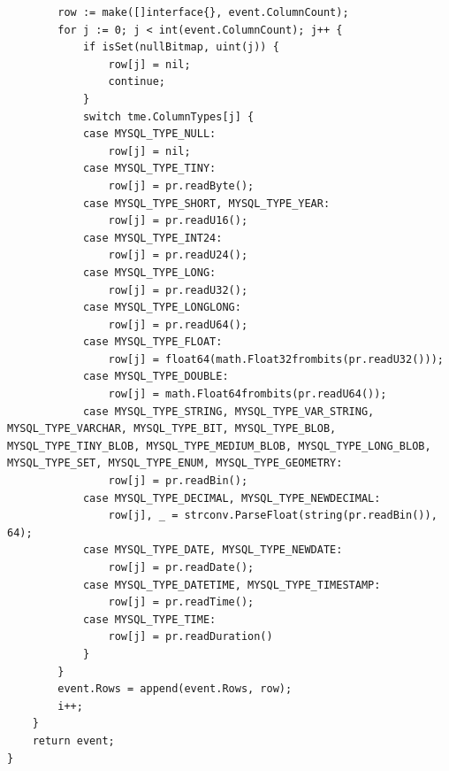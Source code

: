 \documentclass[a4paper, titlepage, 10pt, bookmark]{article}
\begin{document}
\begin{spacing}{1.0}
\begin{lstlisting}
        row := make([]interface{}, event.ColumnCount);
        for j := 0; j < int(event.ColumnCount); j++ {
            if isSet(nullBitmap, uint(j)) {
                row[j] = nil;
                continue;
            }
            switch tme.ColumnTypes[j] {
            case MYSQL_TYPE_NULL:
                row[j] = nil;
            case MYSQL_TYPE_TINY:
                row[j] = pr.readByte();
            case MYSQL_TYPE_SHORT, MYSQL_TYPE_YEAR:
                row[j] = pr.readU16();
            case MYSQL_TYPE_INT24:
                row[j] = pr.readU24();
            case MYSQL_TYPE_LONG:
                row[j] = pr.readU32();
            case MYSQL_TYPE_LONGLONG:
                row[j] = pr.readU64();
            case MYSQL_TYPE_FLOAT:
                row[j] = float64(math.Float32frombits(pr.readU32()));
            case MYSQL_TYPE_DOUBLE:
                row[j] = math.Float64frombits(pr.readU64());
            case MYSQL_TYPE_STRING, MYSQL_TYPE_VAR_STRING, MYSQL_TYPE_VARCHAR, MYSQL_TYPE_BIT, MYSQL_TYPE_BLOB, MYSQL_TYPE_TINY_BLOB, MYSQL_TYPE_MEDIUM_BLOB, MYSQL_TYPE_LONG_BLOB, MYSQL_TYPE_SET, MYSQL_TYPE_ENUM, MYSQL_TYPE_GEOMETRY:
                row[j] = pr.readBin();
            case MYSQL_TYPE_DECIMAL, MYSQL_TYPE_NEWDECIMAL:
                row[j], _ = strconv.ParseFloat(string(pr.readBin()), 64);
            case MYSQL_TYPE_DATE, MYSQL_TYPE_NEWDATE:
                row[j] = pr.readDate();
            case MYSQL_TYPE_DATETIME, MYSQL_TYPE_TIMESTAMP:
                row[j] = pr.readTime();
            case MYSQL_TYPE_TIME:
                row[j] = pr.readDuration()
            }
        }
        event.Rows = append(event.Rows, row);
        i++;
    }
    return event;
}
\end{lstlisting}
\end{spacing}
\end{document}
